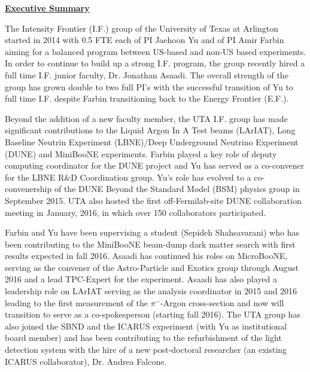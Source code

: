
\begin{center}
\textbf{\Large\underline{Executive Summary} }
\end{center}

The Intensity Frontier (I.F.) group of the University of Texas at Arlington started in 2014 with 0.5 FTE each of PI Jaehoon Yu and of PI Amir Farbin aiming for a balanced program between US-based and non-US based experiments. In order to continue to build up a strong I.F. program, the group recently hired a full time I.F. junior faculty, Dr. Jonathan Asaadi. The overall strength of the group has grown double to two full PI's with the successful transition of Yu to full time I.F. despite Farbin transitioning back to the Energy Frontier (E.F.).

Beyond the addition of a new faculty member, the UTA I.F. group has made significant contributions to the Liquid Argon In A Test beams (LArIAT), Long Baseline Neutrin Experiment (LBNE)/Deep Underground Neutrino Experiment (DUNE) and MiniBooNE experiments. Farbin played a key role of deputy computing coordinator for the DUNE project and Yu has served as a co-convener for the LBNE R$\&$D Coordination group. Yu's role has evolved to a co-convenership of the DUNE Beyond the Standard Model (BSM) physics group in September 2015. UTA also hosted the first off-Fermilab-site DUNE collaboration meeting in January, 2016, in which over 150 collaborators participated. 

Farbin and Yu have been supervising a student (Sepideh Shahsavarani) who has been contributing to the MiniBooNE beam-dump dark matter search with first results expected in fall 2016. Asaadi has continued his roles on MicroBooNE, serving as the convener of the Astro-Particle and Exotics group through August 2016 and a lead TPC-Expert for the experiment. Asaadi has also played a leadership role on LArIAT serving as the analysis coordinator in 2015 and 2016 leading to the first measurement of the $\pi^{-}$-Argon cross-section and now will transition to serve as a co-spokesperson (starting fall 2016). The UTA group has also joined the SBND and the ICARUS experiment (with Yu as institutional board member) and has been contributing to the refurbishment of the light detection system with the hire of a new post-doctoral researcher (an existing ICARUS collaborator), Dr. Andrea Falcone.

